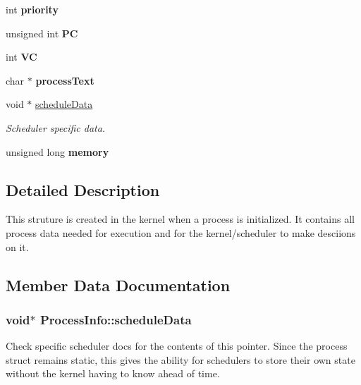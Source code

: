 \begin{DoxyCompactItemize}
\item 
\hypertarget{structProcessInfo_a2f9f55dc3548d0bed66e06db8f47d958}{int {\bfseries priority}}\label{dd/dc8/structProcessInfo_a2f9f55dc3548d0bed66e06db8f47d958}

\item 
\hypertarget{structProcessInfo_a9b2d3f321f21ec1ee97c8dd5e63ac6c8}{unsigned int {\bfseries \-P\-C}}\label{dd/dc8/structProcessInfo_a9b2d3f321f21ec1ee97c8dd5e63ac6c8}

\item 
\hypertarget{structProcessInfo_ab288b59e794cb506663e22c680e05c2d}{int {\bfseries \-V\-C}}\label{dd/dc8/structProcessInfo_ab288b59e794cb506663e22c680e05c2d}

\item 
\hypertarget{structProcessInfo_ae99b529cb79a446c0ff0d1a851b67fc5}{char $\ast$ {\bfseries process\-Text}}\label{dd/dc8/structProcessInfo_ae99b529cb79a446c0ff0d1a851b67fc5}

\item 
void $\ast$ \hyperlink{structProcessInfo_aea1c50ae92f6421ae5c94ac674c1877a}{schedule\-Data}
\begin{DoxyCompactList}\small\item\em \-Scheduler specific data. \end{DoxyCompactList}\item 
\hypertarget{structProcessInfo_aa65ed051998c0493b68feeea5ae4955f}{unsigned long {\bfseries memory}}\label{dd/dc8/structProcessInfo_aa65ed051998c0493b68feeea5ae4955f}

\end{DoxyCompactItemize}


\subsection{\-Detailed \-Description}
\-This struture is created in the kernel when a process is initialized. \-It contains all process data needed for execution and for the kernel/scheduler to make desciions on it. 

\subsection{\-Member \-Data \-Documentation}
\hypertarget{structProcessInfo_aea1c50ae92f6421ae5c94ac674c1877a}{
\subsubsection[{schedule\-Data}]{\setlength{\rightskip}{0pt plus 5cm}void$\ast$ {\bf \-Process\-Info\-::schedule\-Data}}}\label{dd/dc8/structProcessInfo_aea1c50ae92f6421ae5c94ac674c1877a}
\-Check specific scheduler docs for the contents of this pointer. \-Since the process struct remains static, this gives the ability for schedulers to store their own state without the kernel having to know ahead of time. 

